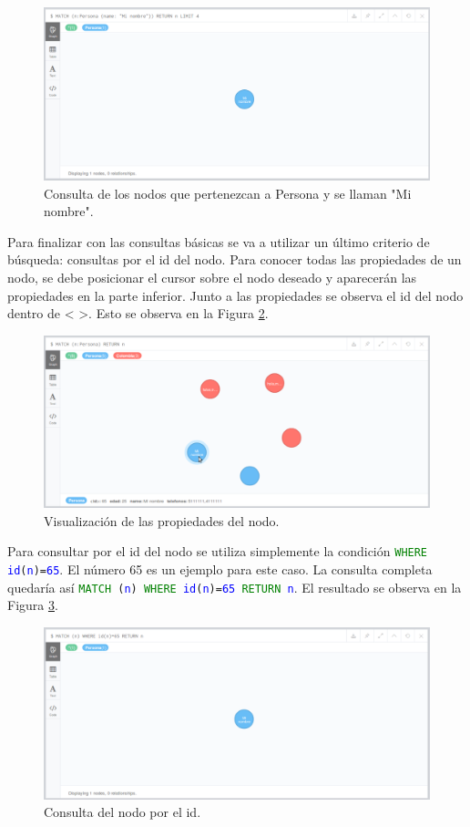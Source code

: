\documentclass[conference]{IEEEtran}
\begin{document}
\begin{figure}[H]
\begin{center}
\includegraphics[width= 0.45 \textwidth]{consulta_label2.png}
\end{center}
\caption{Consulta de los nodos que pertenezcan a Persona y se llaman "Mi nombre".}
\label{fig23}
\end{figure}

Para finalizar con las consultas básicas se va a utilizar un último criterio de búsqueda: consultas por el id del nodo. Para conocer todas las propiedades de un nodo, se debe posicionar el cursor sobre el nodo deseado y aparecerán las propiedades en la parte inferior. Junto a las propiedades se observa el id del nodo dentro de < >. Esto se observa en la Figura \ref{fig24}.

\begin{figure}[H]
\begin{center}
\includegraphics[width= 0.45 \textwidth]{nodo_id.png}
\end{center}
\caption{Visualización de las propiedades del nodo.}
\label{fig24}
\end{figure}

Para consultar por el id del nodo se utiliza simplemente la condición \texttt{\textcolor{green}{WHERE} \textcolor{blue}{id}(\textcolor{blue}{n})=\textcolor{blue}{65}}. El número 65 es un ejemplo para este caso. La consulta completa quedaría así \texttt{\textcolor{green}{MATCH} (\textcolor{blue}{n}) \textcolor{green}{WHERE} \textcolor{blue}{id}(\textcolor{blue}{n})=\textcolor{blue}{65} \textcolor{green}{RETURN} \textcolor{blue}{n}}. El resultado se observa en la Figura \ref{fig25}.

\begin{figure}[H]
\begin{center}
\includegraphics[width= 0.45 \textwidth]{consulta_id.png}
\end{center}
\caption{Consulta del nodo por el id.}
\label{fig25}
\end{figure}
\end{document}
